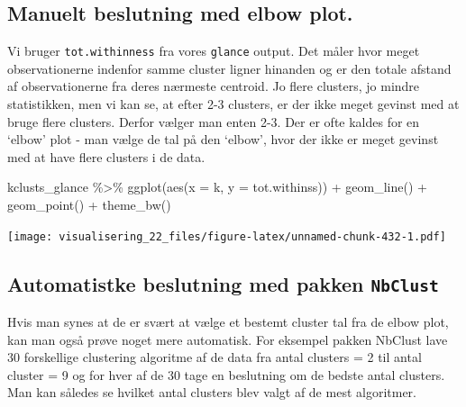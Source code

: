 \documentclass[
]{book}
\newenvironment{Shaded}{\begin{snugshade}}{\end{snugshade}}
\newcommand{\AttributeTok}[1]{\textcolor[rgb]{0.77,0.63,0.00}{#1}}
\newcommand{\FunctionTok}[1]{\textcolor[rgb]{0.00,0.00,0.00}{#1}}
\newcommand{\NormalTok}[1]{#1}
\newcommand{\SpecialCharTok}[1]{\textcolor[rgb]{0.00,0.00,0.00}{#1}}
\begin{document}
\hypertarget{manuelt-beslutning-med-elbow-plot.}{%
\subsection{Manuelt beslutning med elbow plot.}\label{manuelt-beslutning-med-elbow-plot.}}

Vi bruger \texttt{tot.withinness} fra vores \texttt{glance} output. Det måler hvor meget observationerne indenfor samme cluster ligner hinanden og er den totale afstand af observationerne fra deres nærmeste centroid. Jo flere clusters, jo mindre statistikken, men vi kan se, at efter 2-3 clusters, er der ikke meget gevinst med at bruge flere clusters. Derfor vælger man enten 2-3. Der er ofte kaldes for en `elbow' plot - man vælge de tal på den `elbow', hvor der ikke er meget gevinst med at have flere clusters i de data.

\begin{Shaded}
\begin{Highlighting}[]
\NormalTok{kclusts\_glance }\SpecialCharTok{\%\textgreater{}\%} 
  \FunctionTok{ggplot}\NormalTok{(}\FunctionTok{aes}\NormalTok{(}\AttributeTok{x =}\NormalTok{ k, }\AttributeTok{y =}\NormalTok{ tot.withinss)) }\SpecialCharTok{+} 
  \FunctionTok{geom\_line}\NormalTok{() }\SpecialCharTok{+} 
  \FunctionTok{geom\_point}\NormalTok{() }\SpecialCharTok{+} 
  \FunctionTok{theme\_bw}\NormalTok{()}
\end{Highlighting}
\end{Shaded}

\texttt{[image: visualisering\_22\_files/figure-latex/unnamed-chunk-432-1.pdf]}

\hypertarget{automatistke-beslutning-med-pakken-nbclust}{%
\subsection{\texorpdfstring{Automatistke beslutning med pakken \texttt{NbClust}}{Automatistke beslutning med pakken NbClust}}\label{automatistke-beslutning-med-pakken-nbclust}}

Hvis man synes at de er svært at vælge et bestemt cluster tal fra de elbow plot, kan man også prøve noget mere automatisk. For eksempel pakken NbClust lave 30 forskellige clustering algoritme af de data fra antal clusters = 2 til antal cluster = 9 og for hver af de 30 tage en beslutning om de bedste antal clusters. Man kan således se hvilket antal clusters blev valgt af de mest algoritmer.
\end{document}
